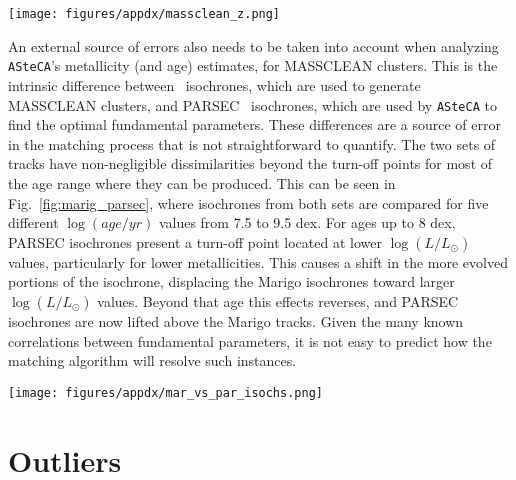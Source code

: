 \documentclass{aa}
\begin{document}
\begin{appendix}
\begin{figure*}
\texttt{[image: figures/appdx/massclean\_z.png]}
\caption{\texttt{ASteCA} metallicity estimates for each mass used to generate
MASSCLEAN clusters. Colors are associated with $\log(age/yr)$ differences, shown
in the color bars to the right. The green dashed horizontal line is the $\Delta
[Fe/H]{=}0$ line, shown as reference.}
\label{fig:massclean_z}
\end{figure*}

An external source of errors also needs to be taken into account when analyzing
\texttt{ASteCA}'s metallicity (and age) estimates, for MASSCLEAN clusters.
%
This is the intrinsic difference between~\cite{Marigo_2008} isochrones, which
are used to generate MASSCLEAN clusters, and PARSEC~\citep{Bressan_2012}
isochrones, which are used by \texttt{ASteCA} to find the optimal fundamental
parameters. These differences are a source of error in the matching
process that is not straightforward to quantify.
%
The two sets of tracks have non-negligible dissimilarities beyond the turn-off
points for most of the age range where they can be produced. This can be seen
in Fig.~\ref{fig:marig_parsec}, where isochrones from both sets are compared for
five different $\log(age/yr)$ values from 7.5 to 9.5 dex.
%
For ages up to 8 dex, PARSEC isochrones present a turn-off point located at
lower $\log(L/L_{\odot})$ values, particularly for lower metallicities. This
causes a shift in the more evolved portions of the isochrone, displacing the
Marigo isochrones toward larger $\log(L/L_{\odot})$ values.
%
Beyond that age this effects reverses, and PARSEC isochrones are now lifted
above the Marigo tracks. Given the many known correlations between fundamental
parameters, it is not easy to predict how the matching algorithm will resolve
such instances.

\begin{figure*}
\texttt{[image: figures/appdx/mar\_vs\_par\_isochs.png]}
\caption{\cite{Marigo_2008} vs. PARSEC~\citep{Bressan_2012} isochrones for
different metallicities and ages.}
\label{fig:marig_parsec}
\end{figure*}





\section{Outliers}
\label{apdx:outliers}


\end{appendix}
\end{document}
